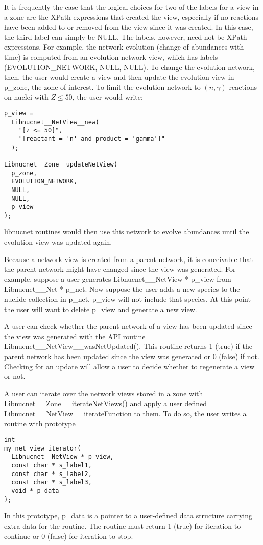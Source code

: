 \documentclass{article}    %
\begin{document}
It is frequently the case that the logical choices for two of the labels
for a view in a zone are the XPath expressions that created the view,
especially if no reactions have been added to or removed from the view
since it was created.  In this case, the third label can simply be NULL.
The labels, however, need not be XPath expressions.  For example, the
network evolution (change of abundances with time) is computed from an
evolution network view, which has labels (EVOLUTION\_NETWORK, NULL, NULL).
To change the evolution network, then, the user would create a view
and then update the evolution view in p\_zone, the zone of interest.  To
limit the evolution network to $(n,\gamma)$ reactions on nuclei with
$Z \leq 50$, the user would write:
\begin{verbatim}
p_view =
  Libnucnet__NetView__new(
    "[z <= 50]",
    "[reactant = 'n' and product = 'gamma']"
  );

Libnucnet__Zone__updateNetView(
  p_zone,
  EVOLUTION_NETWORK,
  NULL,
  NULL,
  p_view
);

\end{verbatim}
libnucnet routines would then use this network to evolve abundances until
the evolution view was updated again.

Because a network view is created from a parent network,
it is conceivable that the parent network might have changed since the
view was generated.  For example, suppose a user generates
Libnucnet\_\_NetView * p\_view from Libnucnet\_\_Net * p\_net.  Now suppose
the user adds a new species to the nuclide collection 
in p\_net.  p\_view will not include that
species.  At this point the user will want to delete p\_view and generate
a new view.

A user can check whether the parent network of a view has been updated
since the view was generated with the API routine
Libnucnet\_\_NetView\_\_wasNetUpdated().  This routine returns 1 (true)
if the parent network has been updated since the view was generated
or 0 (false) if not.  Checking for an update will allow a user to decide
whether to regenerate a view or not.

A user can iterate over the network views stored in a zone
with Libnucnet\_\_Zone\_\_iterateNetViews() and apply a user defined
Libnucnet\_\_NetView\_\_iterateFunction to them.  To do so, the
user writes a routine with prototype
\begin{verbatim}
int
my_net_view_iterator(
  Libnucnet__NetView * p_view,
  const char * s_label1,
  const char * s_label2,
  const char * s_label3,
  void * p_data
);
\end{verbatim}
In this prototype, p\_data is a pointer to a user-defined
data structure carrying extra data for the routine.
The routine must return 1 (true) for iteration to continue
or 0 (false) for iteration to stop.
\end{document}
